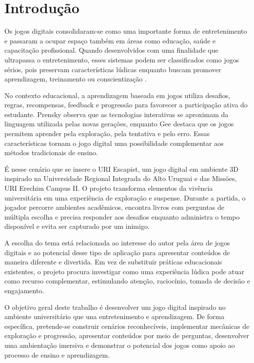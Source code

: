 \documentclass[12pt]{article}
\begin{document}

\section{Introdução}

Os jogos digitais consolidaram-se como uma importante forma de entretenimento e passaram a ocupar espaço também em áreas como educação, saúde e capacitação profissional. Quando desenvolvidos com uma finalidade que ultrapassa o entretenimento, esses sistemas podem ser classificados como jogos sérios, pois preservam características lúdicas enquanto buscam promover aprendizagem, treinamento ou conscientização \cite{abt1970,michael2006}.

No contexto educacional, a aprendizagem baseada em jogos utiliza desafios, regras, recompensas, feedback e progressão para favorecer a participação ativa do estudante. Prensky \cite{prensky2001} observa que as tecnologias interativas se aproximam da linguagem utilizada pelas novas gerações, enquanto Gee \cite{gee2003} destaca que os jogos permitem aprender pela exploração, pela tentativa e pelo erro. Essas características tornam o jogo digital uma possibilidade complementar aos métodos tradicionais de ensino.

É nesse cenário que se insere o URI Escapist, um jogo digital em ambiente 3D inspirado na Universidade Regional Integrada do Alto Uruguai e das Missões, URI Erechim Campus II. O projeto transforma elementos da vivência universitária em uma experiência de exploração e suspense. Durante a partida, o jogador percorre ambientes acadêmicos, encontra livros com perguntas de múltipla escolha e precisa responder aos desafios enquanto administra o tempo disponível e evita ser capturado por um inimigo.

A escolha do tema está relacionada ao interesse do autor pela área de jogos digitais e ao potencial desse tipo de aplicação para apresentar conteúdos de maneira diferente e divertida. Em vez de substituir práticas educacionais existentes, o projeto procura investigar como uma experiência lúdica pode atuar como recurso complementar, estimulando atenção, raciocínio, tomada de decisão e engajamento.

O objetivo geral deste trabalho é desenvolver um jogo digital inspirado no ambiente universitário que una entretenimento e aprendizagem. De forma específica, pretende-se construir cenários reconhecíveis, implementar mecânicas de exploração e progressão, apresentar conteúdos por meio de perguntas, desenvolver uma ambientação imersiva e demonstrar o potencial dos jogos como apoio ao processo de ensino e aprendizagem.
\end{document}
